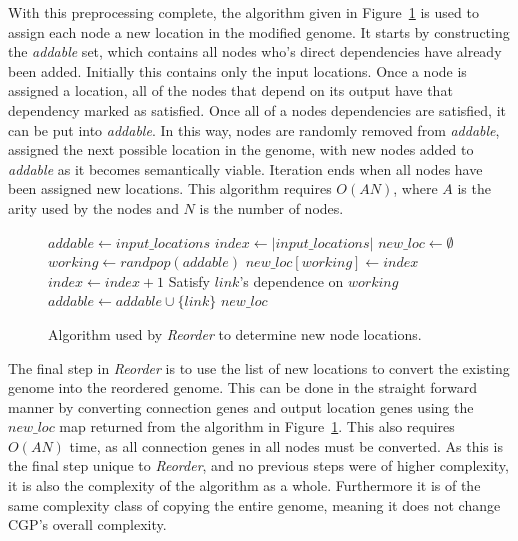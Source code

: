 \documentclass[journal]{IEEEtran}
\begin{document}
With this preprocessing complete, the algorithm given in Figure~\ref{fig:reorder}
is used to assign each node a new location in the modified genome.
It starts by constructing the \emph{addable} set, which contains all nodes who's direct
dependencies have already been added.  Initially this contains only the input locations.
Once a node is assigned a location, all of the nodes that depend on its output
have that dependency marked as satisfied.  Once all of a nodes dependencies
are satisfied, it can be put into \emph{addable}.  In this way, nodes are
randomly removed from \emph{addable}, assigned the next possible location
in the genome, with new nodes added to \emph{addable} as it becomes semantically
viable.  Iteration ends when all nodes have been assigned new locations.
This algorithm requires $O(AN)$, where $A$ is the arity used by the nodes
and $N$ is the number of nodes.

\begin{figure}
  \begin{algorithmic}
    \State $addable \leftarrow input\_locations$
    \State $index \leftarrow |input\_locations|$
    \State $new\_loc \leftarrow \emptyset$
      \State $working \leftarrow randpop(addable)$
        \State $new\_loc[working] \leftarrow index$
        \State $index \leftarrow index + 1$
      \EndIf
        \State Satisfy $link$'s dependence on $working$
          \State $addable \leftarrow addable \cup \{link\}$
        \EndIf
      \EndFor
    \EndWhile
    \State\Return $new\_loc$
    \EndProcedure
  \end{algorithmic}
  \caption{Algorithm used by \emph{Reorder} to determine new node locations.}
  \label{fig:reorder}
\end{figure}

The final step in \emph{Reorder} is to use the list of new locations to convert
the existing genome into the reordered genome.  This can be done in the straight
forward manner by converting connection genes and output location genes using
the $new\_loc$ map returned from the algorithm in Figure~\ref{fig:reorder}.
This also requires $O(AN)$ time, as all connection genes in all nodes must
be converted.  As this is the final step unique to \emph{Reorder}, and
no previous steps were of higher complexity, it is also the complexity of
the algorithm as a whole.  Furthermore it is of the same complexity class
of copying the entire genome, meaning it does not change CGP's overall complexity.
\end{document}
